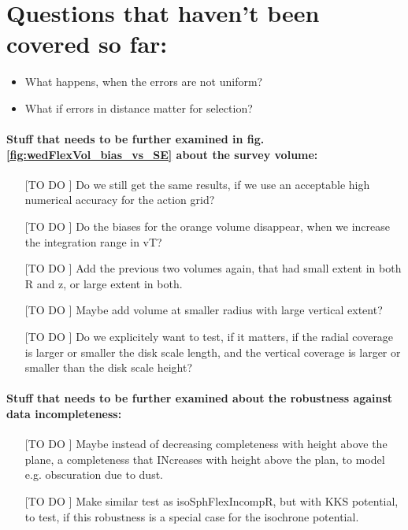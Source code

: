 \section{Questions that haven't been covered so far:}

\begin{itemize}
\item What happens, when the errors are not uniform?
\item What if errors in distance matter for selection?
\end{itemize}

\paragraph{Stuff that needs to be further examined in fig. \ref{fig:wedFlexVol_bias_vs_SE} about the survey volume:}
\begin{itemize}
\item[[TO DO]] Do we still get the same results, if we use an acceptable high numerical accuracy for the action grid?
\item[[TO DO]] Do the biases for the orange volume disappear, when we increase the integration range in vT?
\item[[TO DO]] Add the previous two volumes again, that had small extent in both R and z, or large extent in both.
\item[[TO DO]] Maybe add volume at smaller radius with large vertical extent?
\item[[TO DO]] Do we explicitely want to test, if it matters, if the radial coverage is larger or smaller the disk scale length, and the vertical coverage is larger or smaller than the disk scale height?
\end{itemize}

\paragraph{Stuff that needs to be further examined about the robustness against data incompleteness:}
\begin{itemize}
\item[[TO DO]] Maybe instead of decreasing completeness with height above the plane, a completeness
that INcreases with height above the plan, to model e.g. obscuration due to dust.
\item[[TO DO]] Make similar test as isoSphFlexIncompR, but with KKS potential, to test, if this
robustness is a special case for the isochrone potential.
\end{itemize}

